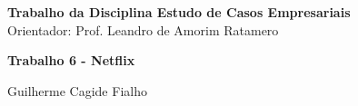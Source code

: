 \documentclass{article}
\begin{document}
\begin{flushright}
  \textbf{Trabalho da Disciplina Estudo de Casos Empresariais} \\
  Orientador: Prof. Leandro de Amorim Ratamero
\end{flushright}

{\large\bfseries Trabalho 6 - Netflix \par}

{\large Guilherme Cagide Fialho \par}

% 

% 

% 

% 

% 

% 

% 

% 

% 

% 
\end{document}
